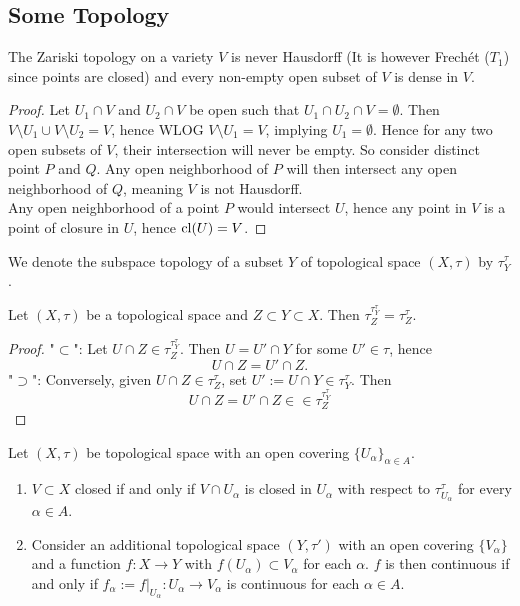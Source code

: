 \subsection{Some Topology}
    \begin{lemma}
        The Zariski topology on a variety $V$ is never Hausdorff (It is however Frechét ($T_1$) since points are closed) and every non-empty open subset of $V$ is dense in $V$.
    \end{lemma}
    \begin{proof}
        Let $U_1\cap V$ and $U_2\cap V$ be open such that $U_1\cap U_2 \cap V=\emptyset$. Then $V\setminus U_1 \cup V\setminus U_2 =V$, hence WLOG $V\setminus U_1 = V$, implying $U_1=\emptyset$. Hence for any two open subsets of $V$, their intersection will never be empty. So consider distinct point $P$ and $Q$. Any open neighborhood of $P$ will then intersect any open neighborhood of $Q$, meaning $V$ is not Hausdorff.\\ 
        Any open neighborhood of a point $P$ would intersect $U$, hence any point in $V$ is a point of closure in $U$, hence $\mathrm{cl}(U)=V$.
    \end{proof}
    We denote the subspace topology of a subset $Y$ of topological space $(X,\tau)$ by $\tau_Y^\tau$.
    \begin{lemma}\label{GeneralTopologyStatement}
        Let $(X,\tau)$ be a topological space and $Z\subset Y\subset X$. Then $\tau_Z^{\tau_Y^\tau}=\tau_Z^\tau$.
    \end{lemma}
    \begin{proof}
        "$\subset$": Let $U\cap Z\in \tau_Z^{\tau_Y^\tau}$. Then $U=U'\cap Y$ for some $U'\in \tau$, hence
        $$U\cap Z = U'\cap Z.$$
        "$\supset$": Conversely, given $U\cap Z\in \tau_Z^\tau$, set $U':= U\cap Y\in \tau_Y^\tau$. Then 
        $$U\cap Z= U'\cap Z \in \in \tau_Z^{\tau_Y^\tau}$$
    \end{proof}
    \begin{lemma}\label{ContinuityCondition}
        Let $(X,\tau)$ be topological space with an open covering $\{U_\alpha\}_{\alpha\in A}$.
        \begin{enumerate}
            \item $V\subset X$ closed if and only if $V\cap U_\alpha $ is closed in $U_\alpha$ with respect to $\tau_{U_\alpha}^\tau$ for every $\alpha\in A$.
            \item Consider an additional topological space $(Y,\tau')$ with an open covering $\{ V_\alpha\}$ and a function $f:X\rightarrow Y$ with $f(U_\alpha)\subset V_\alpha$ for each $\alpha$. $f$ is then continuous if and only if $f_\alpha:=\left.f\right|_{U_\alpha} : U_\alpha\rightarrow V_\alpha$ is continuous for each $\alpha\in A$.  
        \end{enumerate}
    \end{lemma}
